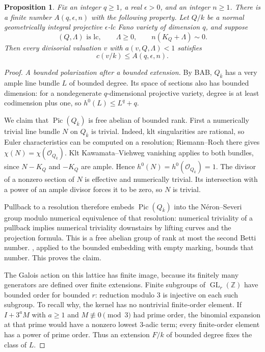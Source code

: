 \documentclass[11pt]{article}
\numberwithin{equation}{section}
\newtheorem{proposition}[theorem]{Proposition}
\theoremstyle{definition}
\newcommand{\Z}{\mathbb Z}
\newcommand{\kb}{\overline{k}}
\newcommand{\OO}{\mathcal O}
\newcommand{\Pic}{\operatorname{Pic}}
\newcommand{\cdeg}[2]{c(#1/#2)}
\begin{document}
\begin{proposition}\label{prop:bab-orbits}
Fix an integer $q\geq1$, a real $\epsilon>0$, and an integer $n\geq1$.
There is a finite number $A(q,\epsilon,n)$ with the following property.
Let $Q/k$ be a normal geometrically integral projective
$\epsilon$-lc Fano variety of dimension $q$, and suppose
\[
 (Q,\Lambda)\text{ is lc},\qquad \Lambda\geq0,
 \qquad n(K_Q+\Lambda)\sim0.
\]
Then every divisorial valuation $v$ with $a(v,Q,\Lambda)<1$ satisfies
\[
 \cdeg{v}{k}\leq A(q,\epsilon,n).
\]
\end{proposition}

\begin{proof}
\emph{A bounded polarization after a bounded extension.}
By BAB, $Q_{\kb}$ has a very ample line bundle $L$ of bounded degree.
Its space of sections also has bounded dimension: for a nondegenerate
$q$-dimensional projective variety, degree is at least codimension
plus one, so $h^0(L)\leq L^q+q$.

We claim that $\Pic(Q_{\kb})$ is free abelian of bounded rank. First a
numerically trivial line bundle $N$ on $Q_{\kb}$ is trivial. Indeed,
klt singularities are rational, so Euler characteristics can be computed
on a resolution; Riemann--Roch there gives
$\chi(N)=\chi(\OO_{Q_{\kb}})$. Klt Kawamata--Viehweg vanishing applies
to both bundles, since $N-K_Q$ and $-K_Q$ are ample. Hence
$h^0(N)=h^0(\OO_{Q_{\kb}})=1$. The divisor of a nonzero section of $N$
is effective and numerically trivial. Its intersection with a power
of an ample divisor forces it to be zero, so $N$ is trivial.

Pullback to a resolution therefore embeds $\Pic(Q_{\kb})$ into the
Néron--Severi group modulo numerical equivalence of that resolution:
numerical triviality of a pullback implies numerical triviality
downstairs by lifting curves and the projection formula. This is a
free abelian group of rank at most the second Betti number.
, applied to the bounded embedding with empty
marking, bounds that number. This proves the claim.

The Galois action on this lattice has finite image, because its finitely
many generators are defined over finite extensions. Finite subgroups
of $\operatorname{GL}_r(\Z)$ have bounded order for bounded $r$:
reduction modulo $3$ is injective on each such subgroup. To recall why,
the kernel has no nontrivial finite-order element. If
$I+3^aM$ with $a\geq1$ and $M\not\equiv0\pmod3$ had prime order,
the binomial expansion at that prime would have a nonzero lowest
$3$-adic term; every finite-order element has a power of prime order.
Thus an extension $F/k$ of bounded degree fixes the class of $L$.


\end{proof}
\end{document}
